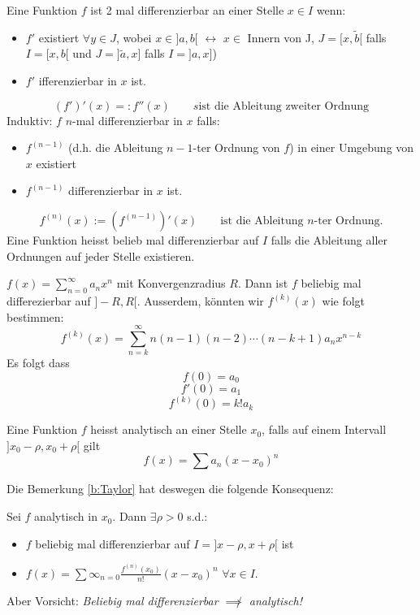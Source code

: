 \begin{Def}
  Eine Funktion $f$ ist 2 mal differenzierbar an einer Stelle $x\in I$ wenn:
  \begin{itemize}
    \item $f'$ existiert $\forall y\in J$, wobei $x\in ]a,b[$ $\leftrightarrow$ $x \in$ Innern von
J, $J=[x,\tilde b[$ falls $I=[x,b[$ und $J= ]\tilde a, x]$ falls $I=]a, x]$)
    \item $f'$ ifferenzierbar in $x$ ist.
  \end{itemize}
  \[(f')' (x)=:f''(x)\qquad s\text{ist die Ableitung zweiter Ordnung}\]
  Induktiv: $f$ $n$-mal differenzierbar in $x$ falls:
  \begin{itemize}
    \item $f^{(n-1)}$ (d.h. die Ableitung $n-1$-ter Ordnung von $f$) 
in einer Umgebung von $x$ existiert
    \item $f^{(n-1)}$ differenzierbar in $x$ ist. 
  \end{itemize}
\[f^{(n)}(x):=\left( f^{(n-1)} \right)'(x) \qquad \mbox{ist die Ableitung $n$-ter Ordnung}.
 \]
Eine Funktion heisst belieb mal differenzierbar auf $I$ falls die Ableitung
aller Ordnungen auf jeder Stelle existieren.
\end{Def}
\begin{Bem}\label{b:Taylor}
  $f(x)=\sum^\infty_{n=0}a_nx^n$ mit Konvergenzradius $R$.
Dann ist $f$ beliebig mal differezierbar auf $]-R,R[$. Ausserdem, k\"onnten wir
$f^{(k)} (x)$ wie folgt bestimmen:
  \[f^{(k)}(x)=\sum^\infty_{n=k}n(n-1)(n-2)\cdots(n-k+1)a_nx^{n-k}\]
Es folgt dass 
\[f(0)=a_0\]
\[f'(0)=a_1\]
\[f^{(k)}(0)=k!a_k\]
\end{Bem}
\begin{Def}
  Eine Funktion $f$ heisst analytisch an einer Stelle $x_0$, falls auf einem Intervall 
$]x_0-\rho, x_0+\rho[$ gilt
\[f(x)=\sum a_n(x-x_0)^n\]
\end{Def}
Die Bemerkung \ref{b:Taylor} hat deswegen die folgende Konsequenz:
\begin{Kor}\label{k:Taylor}
  Sei $f$ analytisch in $x_0$. Dann $\exists \rho>0$ s.d.:
\begin{itemize}
 \item $f$ beliebig mal differenzierbar auf $I=]x-\rho, x+\rho[$ ist
  \item $f(x)=\sum\infty_{n=0}\frac{f^{(n)}(x_0)}{n!}(x-x_0)^n$ $\forall x\in I$.
\end{itemize}
\end{Kor}

Aber Vorsicht:  {\em Beliebig mal differenzierbar $\not\implies$ analytisch!}

